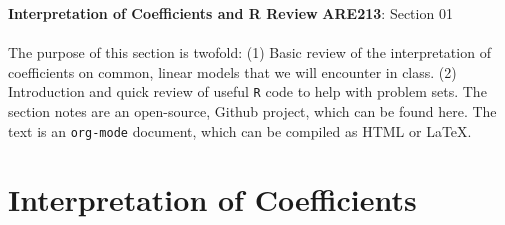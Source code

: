 \documentclass{article}
\title{}
\author{}
\date{\today}
\begin{document}
\setlength{\parindent}{0in}

\textbf{Interpretation of Coefficients and R Review} \hfill
\textbf{ARE213}: Section 01 \\ \\

The purpose of this section is twofold: (1) Basic review of the
interpretation of coefficients on common, linear models that we will
encounter in class. (2) Introduction and quick review of useful \texttt{R}
code to help with problem sets.  The section notes are an open-source,
Github project, which can be found here.  The text is an \texttt{org-mode}
document, which can be compiled as HTML or \LaTeX.

\section*{Interpretation of Coefficients}
\label{sec-1}
\end{document}
